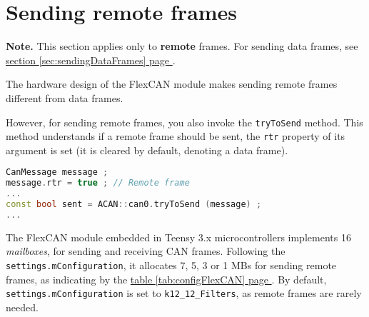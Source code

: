 \documentclass[10pt, a4paper, obeyspaces, openany]{extarticle}
\newcommand \sectionLabel[2]{\section{#1}\label{sec:#2}}
\newcommand\refSectionPage[1]{\hyperref[sec:#1]{section \ref*{sec:#1} page \pageref{sec:#1}}}
\newcommand\refTableauPage[1]{\hyperref[tab:#1]{table \ref*{tab:#1} page \pageref{tab:#1}}}
\begin{document}
%
%
%
%











\sectionLabel{Sending remote frames}{sendingRemoteFrames}

{\bf Note. } This section applies only to {\bf remote} frames. For sending data frames, see \refSectionPage{sendingDataFrames}.

The hardware design of the FlexCAN module makes sending remote frames different from data frames.

However, for sending remote frames, you also invoke the \texttt{tryToSend} method. This method understands if a remote frame should be sent, the \texttt{rtr} property of its argument is set (it is cleared by default, denoting a data frame).

{ \small\begin{lstlisting}[language=c++]
CanMessage message ;
message.rtr = true ; // Remote frame
... 
const bool sent = ACAN::can0.tryToSend (message) ;
...
\end{lstlisting}}

The FlexCAN module embedded in Teensy 3.x microcontrollers implements 16 \emph{mailboxes}, for sending and receiving CAN frames. Following the \texttt{settings.mConfiguration}, it allocates 7, 5, 3 or 1 MBs for sending remote frames, as indicating by the \refTableauPage{configFlexCAN}. By default, \texttt{settings.mConfiguration} is set to \texttt{k12\_12\_Filters}, as remote frames are rarely needed.
\end{document}
